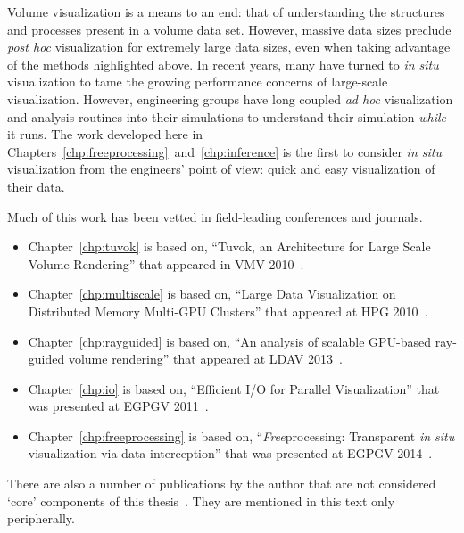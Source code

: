 Volume visualization is a means to an end: that of understanding the
structures and processes present in a volume data set.  However,
massive data
sizes preclude \textit{post hoc} visualization for extremely large data
sizes, even when taking advantage of the methods highlighted above.  In
recent
years, many have turned to \textit{in situ} visualization to tame the
growing performance concerns of large-scale visualization.  However,
engineering groups have long coupled \textit{ad hoc} visualization and
analysis routines into their simulations to understand their simulation
\emph{while} it runs.  The work developed here in
Chapters~\ref{chp:freeprocessing}~and~\ref{chp:inference} is the first
to consider
\textit{in situ} visualization from the engineers' point of view: quick
and easy visualization of their data.

Much of this work has been vetted in field-leading conferences and
journals.
\begin{itemize}

  \item Chapter~\ref{chp:tuvok} is based on, ``Tuvok, an
  Architecture for Large Scale Volume Rendering'' that appeared in VMV
  2010~\cite{Fogal:2010:Tuvok}.

  \item Chapter~\ref{chp:multiscale} is based on, ``Large Data
  Visualization on Distributed Memory Multi-GPU Clusters'' that
  appeared at HPG 2010~\cite{Fogal:2010:HPG}.

	\item Chapter~\ref{chp:rayguided} is based on, ``An analysis of scalable
	GPU-based ray-guided volume rendering'' that appeared at LDAV
	2013~\cite{Fogal:2013:Analysis}.

  \item Chapter~\ref{chp:io} is based on, ``Efficient I/O
  for Parallel Visualization'' that was presented at EGPGV
  2011~\cite{Fogal:2011:PracticalIO}.

	\item Chapter~\ref{chp:freeprocessing} is based on,
	``\textit{Free}processing: Transparent \textit{in situ} visualization via
	data interception'' that was presented at EGPGV
	2014~\cite{Fogal:2014:Freeprocessing}.

\end{itemize}

There are also a number of publications by the author that are not
considered
`core' components of this thesis~\cite{Fogal:2009:SizeMatters,
Fogal:2010:Bridge, Jevremovic:2011:Education, Jovana:2012:Interactive,
Brownlee:2012:GLuRay, Childs:2012:VisIt, Hermilo:2013:Steering,
Butson:2013:DBS}.  They are mentioned in this text only peripherally.
